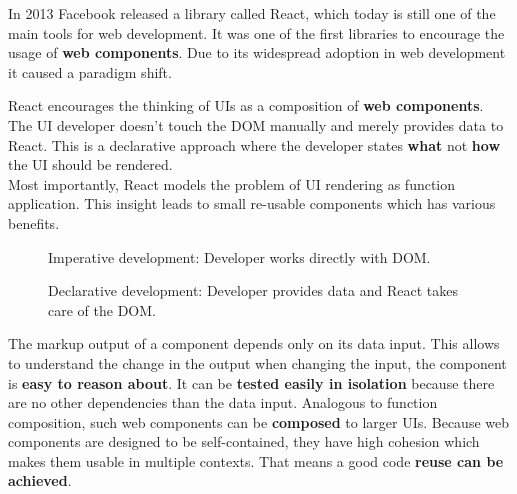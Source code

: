 In 2013 Facebook released a library called React, which today is still one of the main tools for web development. It was one of the first libraries to encourage the usage of \textbf{web components}. Due to its widespread adoption in web development it caused a paradigm shift.

React encourages the thinking of UIs as a composition of \textbf{web components}. The UI developer doesn't touch the DOM manually and merely provides data to React. This is a declarative approach where the developer states \textbf{what} not \textbf{how} the UI should be rendered. \\
Most importantly, React models the problem of UI rendering as function application. This insight leads to small re-usable components which has various benefits.


\begin{figure}[!htb]
  \caption{\label{fig:my-label} Imperative development: Developer works directly with DOM.}
\end{figure}

\begin{figure}[!htb]
  \caption{\label{fig:my-label} Declarative development: Developer provides data and React takes care of the DOM.}
\end{figure}

The markup output of a component depends only on its data input. This allows to understand the change in the output when changing the input, the component is \textbf{easy to reason about}. It can be \textbf{tested easily in isolation} because there are no other dependencies than the data input. Analogous to function composition, such web components can be \textbf{composed} to larger UIs. Because web components are designed to be self-contained, they have high cohesion which makes them usable in multiple contexts. That means a good code \textbf{reuse can be achieved}.


